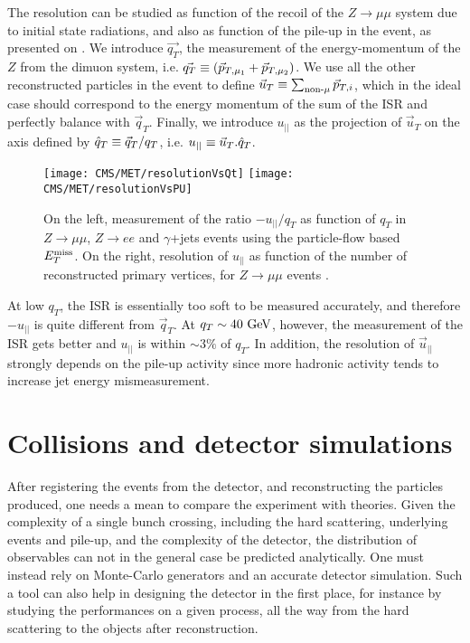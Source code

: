     The resolution can be studied as function of the recoil of the $Z \rightarrow \mu\mu$
    system due to initial state radiations, and also as function of the pile-up in the
    event, as presented on . We introduce $\vec{q_T}$,
    the measurement of the energy-momentum of the $Z$ from the dimuon system, i.e.
    $\vec{q_T} \equiv (\vec{p}_{T,\mu_1} + \vec{p}_{T,\mu_2})$. We use all the other
    reconstructed particles in the event to define $\vec{u}_T \equiv \sum_{\text{non-}\mu} \vec{p}_{T,i}$,
    which in the ideal case should correspond to the energy momentum of the sum of the
    ISR and perfectly balance with $\vec{q}_T$. Finally, we introduce $u_{||}$ as the
    projection of $\vec{u}_T$ on the axis defined by $\hat{q}_T \equiv \vec{q}_T
    / q_T$, i.e. $u_{||} \equiv \vec{u}_T . \hat{q}_T$.

    \begin{figure}[h!]
        \centering
        \texttt{[image: CMS/MET/resolutionVsQt]}
        \texttt{[image: CMS/MET/resolutionVsPU]}
        \caption{On the left, measurement of the ratio $-u_{||}/q_T$ as function of $q_T$
        in $Z\rightarrow\mu\mu$, $Z\rightarrow e e$ and $\gamma$+jets events using
        the particle-flow based $E_T^\text{miss}$. On the right, resolution of
        $u_{||}$ as function of the number of reconstructed primary vertices, for
        $Z\rightarrow\mu\mu$ events \cite{METperf}.}
        \label{fig:METresolution}
    \end{figure}

    At low $q_T$, the ISR is essentially too soft to be measured accurately, and
    therefore $- u_{||}$ is quite different from $\vec{q}_T$. At $q_T \sim 40~\text{GeV}$,
    however, the measurement of the ISR gets better and $u_{||}$ is within $\sim 3\%$
    of $q_T$. In addition, the resolution of $\vec{u}_{||}$ strongly depends on the
    pile-up activity since more hadronic activity tends to increase jet energy
    mismeasurement.

    \section{Collisions and detector simulations \label{sec:simu}}

    After registering the events from the detector, and reconstructing the particles
    produced, one needs a mean to compare the experiment with theories. Given
    the complexity of a single bunch crossing, including the hard scattering,
    underlying events and pile-up, and the complexity of the detector, the distribution
    of observables can not in the general case be predicted analytically. One must
    instead rely on Monte-Carlo generators and an accurate detector simulation.
    Such a tool can also help in designing the detector in the first place, for
    instance by studying the performances on a given process, all the way
    from the hard scattering to the objects after reconstruction.

